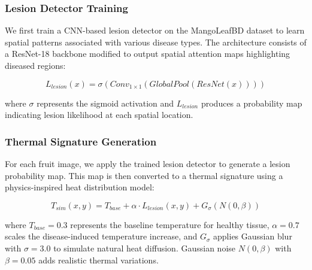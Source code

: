 \documentclass[conference]{IEEEtran}
\begin{document}
\subsubsection{Lesion Detector Training}

We first train a CNN-based lesion detector on the MangoLeafBD dataset to learn spatial patterns associated with various disease types. The architecture consists of a ResNet-18 backbone modified to output spatial attention maps highlighting diseased regions:

\begin{equation}
L_{lesion}(x) = \sigma(Conv_{1×1}(GlobalPool(ResNet(x))))
\end{equation}

where $\sigma$ represents the sigmoid activation and $L_{lesion}$ produces a probability map indicating lesion likelihood at each spatial location.

\subsubsection{Thermal Signature Generation}

For each fruit image, we apply the trained lesion detector to generate a lesion probability map. This map is then converted to a thermal signature using a physics-inspired heat distribution model:

\begin{equation}
T_{sim}(x,y) = T_{base} + \alpha \cdot L_{lesion}(x,y) + G_{\sigma}(N(0,\beta))
\end{equation}

where $T_{base} = 0.3$ represents the baseline temperature for healthy tissue, $\alpha = 0.7$ scales the disease-induced temperature increase, and $G_{\sigma}$ applies Gaussian blur with $\sigma = 3.0$ to simulate natural heat diffusion. Gaussian noise $N(0,\beta)$ with $\beta = 0.05$ adds realistic thermal variations.
\end{document}
